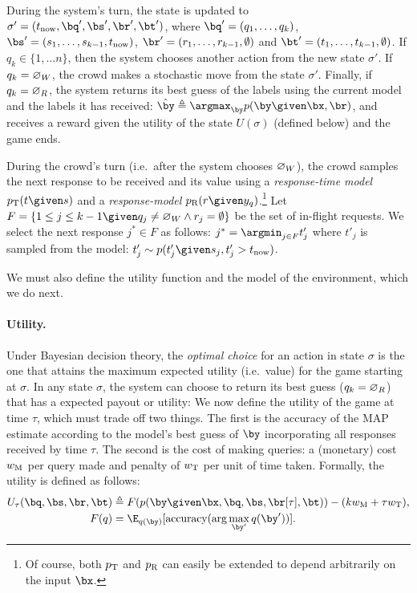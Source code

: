 During the system's turn,
the state is updated to $\sigma' = (\now, \bq', \bs', \br', \bt')$, where $\bq' = (q_1, \ldots, q_k)$, $\bs' = (s_1, \ldots, s_{k-1}, \now)$, $\br' = (r_1, \ldots, r_{k-1}, \emptyset)$ and $\bt' = (t_1, \ldots, t_{k-1}, \emptyset)$.
If $q_k \in \{1, \ldots n\}$, then the system chooses another action from the new state $\sigma'$.
If $q_k = \varnothing_{W}$, the crowd makes a stochastic move from the state $\sigma'$.
Finally, if $q_k = \varnothing_{R}$, the system returns its best guess of the labels using the current model and the labels it has received:
$\hat\by \eqdef \argmax_{\by} p(\by \given \bx, \br)$,
and receives a reward given the utility of the state $U(\sigma)$ (defined below) and the game ends. 

During the crowd's turn (i.e.\ after the system chooses $\varnothing_{W}$), the crowd samples the next response to be received and its value using a \emph{response-time model} $\ptime(t \given s)$ and a \emph{response-model} $\presp(r \given y_q)$.\footnote{
Of course, both $p_{\text{T}}$ and $p_{\text{R}}$ can easily be extended to depend arbitrarily on the input $\bx$.} Let $F = \{1 \le j \le k-1 \given q_j \neq \acwait \wedge r_j = \emptyset \}$ be the set of in-flight requests.
We select the next response $j^* \in F$ as follows: $j^* = \argmin_{j \in F} t'_j$ where $t'_j$ is sampled from the model: $t'_j \sim p(t'_j \given s_j, t'_j > \now)$.

We must also define the utility function and the model of the environment, which we do next.

\paragraph{Utility.}
Under Bayesian decision theory, the \emph{optimal choice} for an action in state $\sigma$ is the one that attains the maximum expected utility (i.e.\ value) for the game starting at $\sigma$.
In any state $\sigma$, the system can choose to return its best guess ($q_k = \varnothing_{R}$) that has a expected payout or utility:
We now define the utility of the game at time $\tau$, which must trade off two things.
The first is the accuracy of the MAP estimate according to the model's best guess of $\by$ incorporating all responses received by time $\tau$.
The second is the cost of making queries: a (monetary) cost $w_\text{M}$ per query made and penalty of $w_\text{T}$ per unit of time taken.
Formally, the utility is defined as follows:
\begin{align}
  \label{eqn:utility}
  U_\tau(\bq, \bs, \br, \bt) &\eqdef F(p(\by \given \bx, \bq, \bs, \br[\tau], \bt)) - (k \weightmoney + \tau \weighttime), \\
  F(q) &= \E_{q(\by)}[\accuracy(\arg\max_{\by'} q(\by'))].
\end{align}

